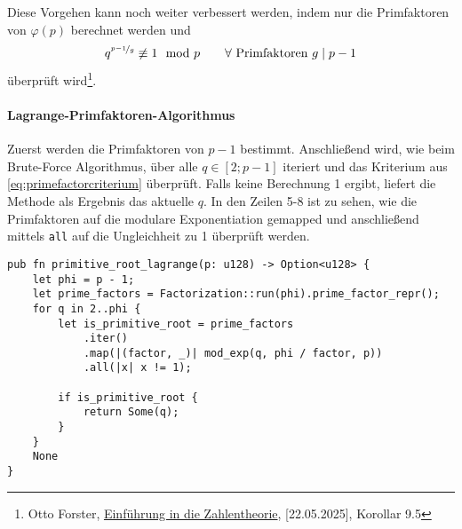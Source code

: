Diese Vorgehen kann noch weiter verbessert werden, indem nur die Primfaktoren von $\varphi(p)$ berechnet
werden und 
\begin{equation} \label{eq:primefactorcriterium}
    q^{\nicefrac{p-1}{g}} \not\equiv 1 \mod p\qquad\forall \text{ Primfaktoren } g \mid p - 1    
\end{equation}
überprüft wird\footnote{Otto Forster, \href{https://www.mathematik.uni-muenchen.de/~forster/v/zth/inzth_09.pdf}{Einführung in die Zahlentheorie}, [22.05.2025], Korollar 9.5}.
\paragraph{Lagrange-Primfaktoren-Algorithmus}
Zuerst werden die Primfaktoren von $p-1$ bestimmt. Anschließend wird, wie beim Brute-Force Algorithmus, über alle
$q\in[2;p-1]$ iteriert und das Kriterium aus \ref{eq:primefactorcriterium} überprüft. Falls keine Berechnung 1 ergibt,
liefert die Methode als Ergebnis das aktuelle $q$. In den Zeilen 5-8 ist zu sehen, wie die Primfaktoren auf die
modulare Exponentiation gemapped und anschließend mittels \texttt{all} auf die Ungleichheit zu 1 überprüft werden.
\begin{verbatim}
pub fn primitive_root_lagrange(p: u128) -> Option<u128> {
    let phi = p - 1;
    let prime_factors = Factorization::run(phi).prime_factor_repr();
    for q in 2..phi {
        let is_primitive_root = prime_factors
            .iter()
            .map(|(factor, _)| mod_exp(q, phi / factor, p))
            .all(|x| x != 1);

        if is_primitive_root {
            return Some(q);
        }
    }
    None
}
\end{verbatim}
\newpage

